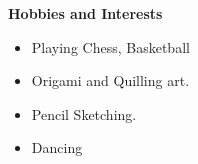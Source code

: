 \documentclass[a4paper,10pt]{article}
\begin{document}
\colorbox{titleColor}{\parbox{6.7in}{\textbf{Hobbies and Interests}}}

\begin{itemize}
        \setlength{\itemsep}{1pt}
\item Playing Chess, Basketball
\end{itemize}

\begin{itemize}
        \setlength{\itemsep}{1pt}
\item Origami and Quilling art.
\end{itemize}

\begin{itemize}
        \setlength{\itemsep}{1pt}
\item Pencil Sketching.
\end{itemize}

\begin{itemize}
        \setlength{\itemsep}{1pt}
\item Dancing
\end{itemize}
\end{document}
